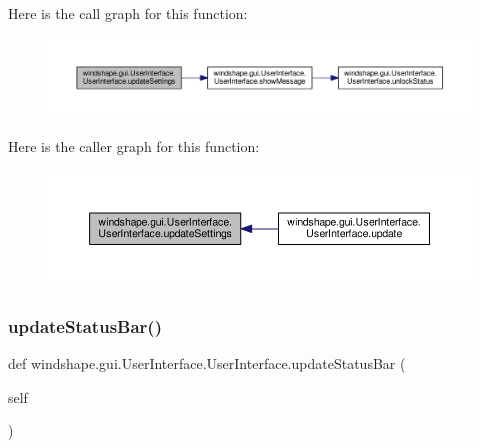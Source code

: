 Here is the call graph for this function\+:\nopagebreak
\begin{figure}[H]
\begin{center}
\leavevmode
\includegraphics[width=350pt]{classwindshape_1_1gui_1_1_user_interface_1_1_user_interface_a0c45babf6fcb71ad8ffe53dbecf07e99_cgraph}
\end{center}
\end{figure}
Here is the caller graph for this function\+:\nopagebreak
\begin{figure}[H]
\begin{center}
\leavevmode
\includegraphics[width=350pt]{classwindshape_1_1gui_1_1_user_interface_1_1_user_interface_a0c45babf6fcb71ad8ffe53dbecf07e99_icgraph}
\end{center}
\end{figure}
\mbox{\label{classwindshape_1_1gui_1_1_user_interface_1_1_user_interface_a8b50a6746f4bfc24923999b5022896c8}} 
\subsubsection{\texorpdfstring{update\+Status\+Bar()}{updateStatusBar()}}
{\footnotesize\ttfamily def windshape.\+gui.\+User\+Interface.\+User\+Interface.\+update\+Status\+Bar (\begin{DoxyParamCaption}\item[{}]{self }\end{DoxyParamCaption})}

